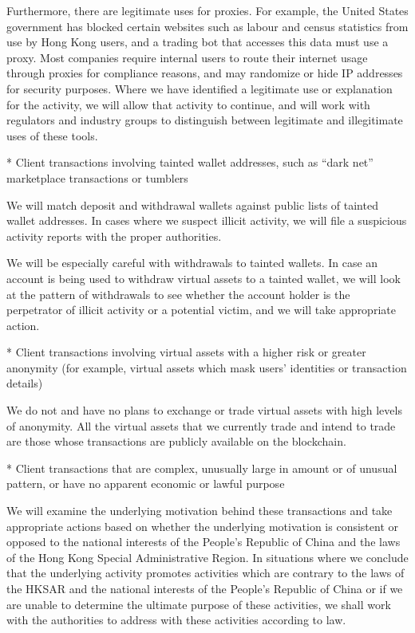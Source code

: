 Furthermore, there are legitimate uses for proxies.  For example, the
United States government has blocked certain websites such as labour
and census statistics from use by Hong Kong users, and a trading bot
that accesses this data must use a proxy.  Most companies require
internal users to route their internet usage through proxies for
compliance reasons, and may randomize or hide IP addresses for security
purposes.  Where we have identified a legitimate use or explanation
for the activity, we will allow that activity to continue, and will
work with regulators and industry groups to distinguish between
legitimate and illegitimate uses of these tools.

* Client transactions involving tainted wallet addresses, such as
“dark net” marketplace transactions or tumblers

We will match deposit and withdrawal wallets against public lists of
tainted wallet addresses.  In cases where we suspect illicit activity,
we will file a suspicious activity reports with the proper
authorities.

We will be especially careful with withdrawals to tainted wallets.  In
case an account is being used to withdraw virtual assets to a
tainted wallet, we will look at the pattern of withdrawals to see
whether the account holder is the perpetrator of illicit
activity or a potential victim, and we will take appropriate action.

* Client transactions involving virtual assets with a higher risk or
greater anonymity (for example, virtual assets which mask users’
identities or transaction details)

We do not and have no plans to exchange or trade virtual assets with
high levels of anonymity.  All the virtual assets that we currently
trade and intend to trade are those whose transactions are publicly
available on the blockchain.

* Client transactions that are complex, unusually large in amount or
of unusual pattern, or have no apparent economic or lawful purpose

We will examine the underlying motivation behind these transactions
and take appropriate actions based on whether the underlying
motivation is consistent or opposed to the national interests of the
People's Republic of China and the laws of the Hong Kong Special
Administrative Region.  In situations where we conclude that the
underlying activity promotes activities which are contrary to the laws
of the HKSAR and the national interests of the People's Republic
of China or if we are unable to determine the ultimate purpose of
these activities, we shall work with the authorities to address with
these activities according to law.

